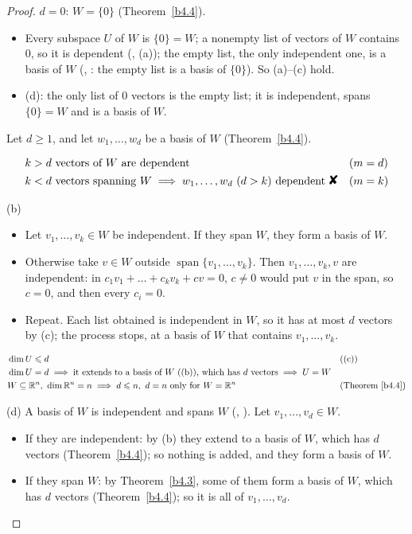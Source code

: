 \documentclass[12pt]{article}
\newcommand{\R}{\mathbb R}
\newcommand{\contradiction}{\mathord{\text{\large\ding{56}}}}
\DeclareMathOperator{\Span}{span}
\theoremstyle{definition}
\newcommand{\boardtop}{\vspace*{-\abovedisplayskip}}
\begin{document}
\begin{proof}
\(d=0\): \(W=\{0\}\) (Theorem~\ref{b4.4}).
\begin{itemize}
\item Every subspace \(U\) of \(W\) is \(\{0\}=W\); a nonempty list of vectors of \(W\) contains \(0\), so it is
dependent (, (a)); the empty list, the only independent one, is a basis of \(W\)
(, : the empty list is a basis of \(\{0\}\)). So (a)--(c) hold.
\item (d): the only list of \(0\) vectors is the empty list; it is independent, spans \(\{0\}=W\) and is a basis of \(W\).
\end{itemize}
Let \(d\geqslant1\), and let \(w_1,\dots,w_d\) be a basis of \(W\) (Theorem~\ref{b4.4}).
\begin{board}
\boardtop
\begin{align*}
&k>d\text{ vectors of }W\text{ are dependent}&&(m=d)\\
&k<d\text{ vectors spanning }W\implies w_1,\dots,w_d\ (d>k)\text{ dependent}\ \contradiction&&(m=k)
\end{align*}
\end{board}
(b)
\begin{itemize}
\item Let \(v_1,\dots,v_k\in W\) be independent. If they span \(W\), they form a basis of \(W\).
\item Otherwise take \(v\in W\) outside \(\Span\{v_1,\dots,v_k\}\). Then \(v_1,\dots,v_k,v\) are independent: in
\(c_1v_1+\dots+c_kv_k+cv=0\), \(c\ne0\) would put \(v\) in the span, so \(c=0\), and then every \(c_i=0\).
\item Repeat. Each list obtained is independent in \(W\), so it has at most \(d\) vectors by (c); the process stops, at
a basis of \(W\) that contains \(v_1,\dots,v_k\).
\end{itemize}
\begin{board}
\boardtop
\begin{align*}
&\dim U\leqslant d&&\text{((c))}\\
&\dim U=d\implies\text{it extends to a basis of \(W\) ((b)), which has \(d\) vectors}\implies U=W\\
&W\subseteq\R^n,\ \dim\R^n=n\implies d\leqslant n,\ d=n\text{ only for }W=\R^n&&\text{(Theorem~\ref{b4.4})}
\end{align*}
\end{board}
(d) A basis of \(W\) is independent and spans \(W\) (, ). Let \(v_1,\dots,v_d\in W\).
\begin{itemize}
\item If they are independent: by (b) they extend to a basis of \(W\), which has \(d\) vectors
(Theorem~\ref{b4.4}); so nothing is added, and they form a basis of \(W\).
\item If they span \(W\): by Theorem~\ref{b4.3}, some of them form a basis of \(W\), which has \(d\) vectors
(Theorem~\ref{b4.4}); so it is all of \(v_1,\dots,v_d\).\qedhere
\end{itemize}
\end{proof}
\end{document}
